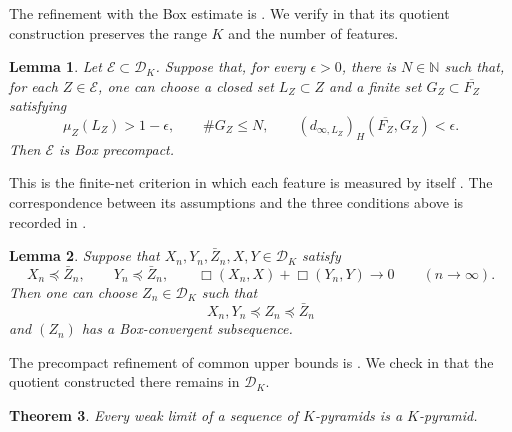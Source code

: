 \documentclass[10pt,a4paper]{amsart}
\newtheorem{theorem}{Theorem}[section]
\newtheorem{lemma}[theorem]{Lemma}
\newcommand{\DK}{\mathcal D_K}
\begin{document}
The refinement with the Box estimate is \cite[Lemma~5.4]{gds2}. We verify in  that its quotient construction preserves the range $K$ and the number of features.

\begin{lemma}
\label{lem:finite-net-precompactness}
Let $\mathcal E\subset\DK$. Suppose that, for every $\epsilon>0$, there is $N\in\mathbb N$ such that, for each $Z\in\mathcal E$, one can choose a closed set $L_Z\subset Z$ and a finite set $G_Z\subset\overline{F_Z}$ satisfying
\[
\mu_Z(L_Z)>1-\epsilon,\qquad\#G_Z\leq N,\qquad(d_{\infty,L_Z})_H(\overline{F_Z},G_Z)<\epsilon.
\]
Then $\mathcal E$ is Box precompact.
\end{lemma}

This is the finite-net criterion in which each feature is measured by itself \cite[Lemma~4.12]{gds2}. The correspondence between its assumptions and the three conditions above is recorded in .

\begin{lemma}
\label{lem:K-common-upper-bound}
Suppose that $X_n,Y_n,\bar Z_n,X,Y\in\DK$ satisfy
\[
X_n\preceq\bar Z_n,\qquad Y_n\preceq\bar Z_n,\qquad\Box(X_n,X)+\Box(Y_n,Y)\longrightarrow0\qquad(n\to\infty).
\]
Then one can choose $Z_n\in\DK$ such that
\[
X_n,Y_n\preceq Z_n\preceq\bar Z_n
\]
and $(Z_n)$ has a Box-convergent subsequence.
\end{lemma}

The precompact refinement of common upper bounds is \cite[Lemma~5.6]{gds2}. We check in  that the quotient constructed there remains in $\DK$.

\begin{theorem}
\label{thm:K-pyramid-weak-limit}
Every weak limit of a sequence of $K$-pyramids is a $K$-pyramid.
\end{theorem}
\end{document}
